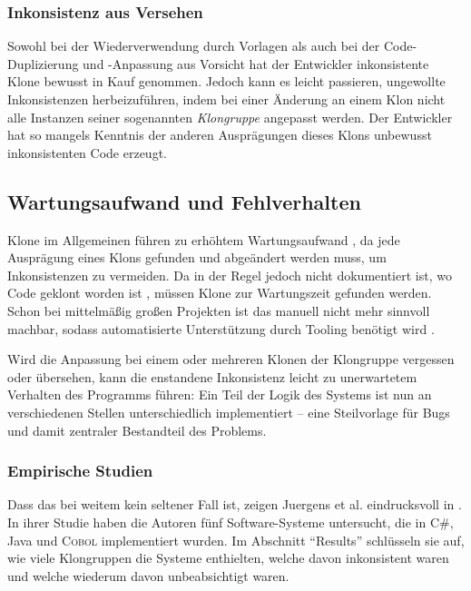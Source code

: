 \subsubsection{Inkonsistenz aus Versehen}

Sowohl bei der Wiederverwendung durch Vorlagen als auch bei der Code-Duplizierung und -Anpassung aus Vorsicht hat der Entwickler inkonsistente Klone bewusst in Kauf genommen. Jedoch kann es leicht passieren, ungewollte Inkonsistenzen herbeizuführen, indem bei einer Änderung an einem Klon nicht alle Instanzen seiner sogenannten \textit{Klongruppe} angepasst werden. Der Entwickler hat so mangels Kenntnis der anderen Ausprägungen dieses Klons unbewusst inkonsistenten Code erzeugt.


\subsection{Wartungsaufwand und Fehlverhalten}

Klone im Allgemeinen führen zu erhöhtem Wartungsaufwand \cite{koschke2007survey}, da jede Ausprägung eines Klons gefunden und abgeändert werden muss, um Inkonsistenzen zu vermeiden. Da in der Regel jedoch nicht dokumentiert ist, wo Code geklont worden ist \cite{koschke2013Similarity}, müssen Klone zur Wartungszeit gefunden werden. Schon bei mittelmäßig großen Projekten ist das manuell nicht mehr sinnvoll machbar, sodass automatisierte Unterstützung durch Tooling benötigt wird  \cite{koschke2013Similarity}.

Wird die Anpassung bei einem oder mehreren Klonen der Klongruppe vergessen oder übersehen, kann die enstandene Inkonsistenz leicht zu unerwartetem Verhalten des Programms führen: Ein Teil der Logik des Systems ist nun an verschiedenen Stellen unterschiedlich implementiert -- eine Steilvorlage für Bugs und damit zentraler Bestandteil des Problems.


\subsubsection{Empirische Studien}

Dass das bei weitem kein seltener Fall ist, zeigen Juergens et al. eindrucksvoll in \cite{juergens2009code}. In ihrer Studie haben die Autoren fünf Software-Systeme untersucht, die in C\#, Java und \textsc{Cobol} implementiert wurden. Im Abschnitt \enquote{Results} schlüsseln sie auf, wie viele Klongruppen die Systeme enthielten, welche davon inkonsistent waren und welche wiederum davon unbeabsichtigt waren.

